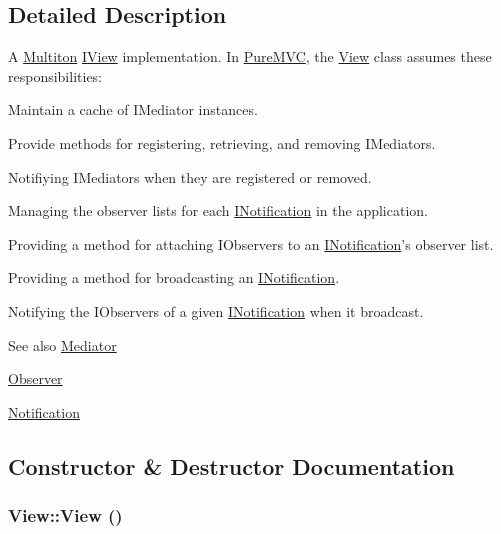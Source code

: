 \subsection{Detailed Description}
A \hyperlink{class_pure_m_v_c_1_1_multiton}{Multiton} {\ttfamily \hyperlink{class_pure_m_v_c_1_1_i_view}{IView}} implementation. In \hyperlink{namespace_pure_m_v_c}{PureMVC}, the {\ttfamily \hyperlink{class_pure_m_v_c_1_1_view}{View}} class assumes these responsibilities: 
\begin{DoxyItemize}
\item Maintain a cache of {\ttfamily IMediator} instances. 
\item Provide methods for registering, retrieving, and removing {\ttfamily IMediators}. 
\item Notifiying {\ttfamily IMediators} when they are registered or removed. 
\item Managing the observer lists for each {\ttfamily \hyperlink{class_pure_m_v_c_1_1_i_notification}{INotification}} in the application. 
\item Providing a method for attaching {\ttfamily IObservers} to an {\ttfamily \hyperlink{class_pure_m_v_c_1_1_i_notification}{INotification}}'s observer list. 
\item Providing a method for broadcasting an {\ttfamily \hyperlink{class_pure_m_v_c_1_1_i_notification}{INotification}}. 
\item Notifying the {\ttfamily IObservers} of a given {\ttfamily \hyperlink{class_pure_m_v_c_1_1_i_notification}{INotification}} when it broadcast. 
\end{DoxyItemize}

\begin{DoxySeeAlso}{See also}
\hyperlink{class_pure_m_v_c_1_1_mediator}{Mediator} 

\hyperlink{class_pure_m_v_c_1_1_observer}{Observer} 

\hyperlink{class_pure_m_v_c_1_1_notification}{Notification} 
\end{DoxySeeAlso}


\subsection{Constructor \& Destructor Documentation}
\hypertarget{class_pure_m_v_c_1_1_view_a44ad60a768422d3fa8fbd7576950080a}{
\subsubsection[{View}]{\setlength{\rightskip}{0pt plus 5cm}View::View ()}}
\label{class_pure_m_v_c_1_1_view_a44ad60a768422d3fa8fbd7576950080a}


